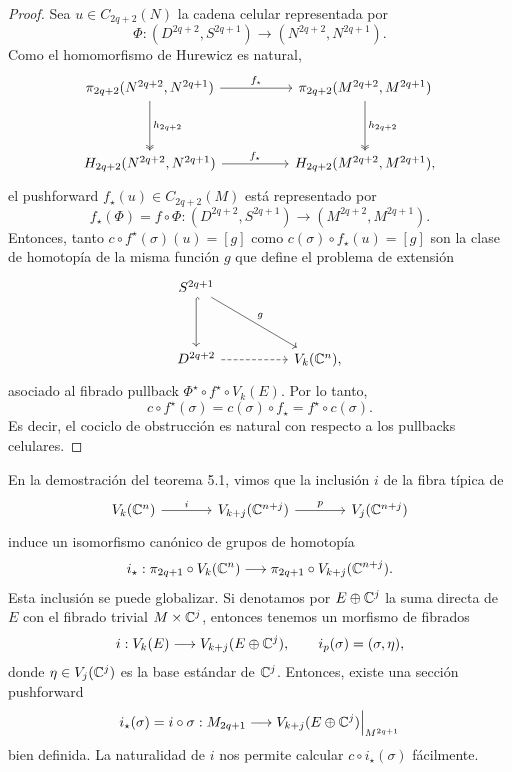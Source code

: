 \begin{proof}
Sea $u \in C_{2q+2}(N)$ la cadena celular representada por
$$\Phi : (D^{2q+2}, S^{2q+1}) \longrightarrow (N^{2q+2}, N^{2q+1}).$$
Como el homomorfismo de Hurewicz es natural,
$$
\begin{tikzcd}[row sep = huge, column sep = huge]
    \pi_{2q+2}(N^{2q+2}, N^{2q+1}) \arrow[r, "f_\star"] \arrow[d, two heads, "h_{2q+2}"]
        & \pi_{2q+2}(M^{2q+2}, M^{2q+1}) \arrow[d, two heads, "h_{2q+2}"] \\
    H_{2q+2}(N^{2q+2}, N^{2q+1}) \arrow[r, "f_\star"]
        & H_{2q+2}(M^{2q+2}, M^{2q+1}),
\end{tikzcd}
$$
el pushforward $f_\star(u) \in C_{2q+2}(M)$ está representado por
$$f_\star(\Phi) = f \circ \Phi : (D^{2q+2}, S^{2q+1}) \longrightarrow (M^{2q+2}, M^{2q+1}).$$
Entonces, tanto $c \circ f^\star(\sigma)(u) = [g]$ como $c(\sigma) \circ f_\star(u) = [g]$ son la clase de homotopía de la misma función $g$ que define el problema de extensión
$$
\begin{tikzcd}[row sep = huge, column sep = huge]
    S^{2q+1} \arrow[d, hook] \arrow[rd, "g"] \\
    D^{2q+2} \arrow[r, dashed] & V_k(\C^n),
\end{tikzcd}
$$
asociado al fibrado pullback $\Phi^\star \circ f^\star \circ V_k(E)$. Por lo tanto,
$$c \circ f^\star(\sigma) = c(\sigma) \circ f_\star = f^\star \circ c(\sigma).$$
Es decir, el cociclo de obstrucción es natural con respecto a los pullbacks celulares.
\end{proof}

En la demostración del teorema 5.1, vimos que la inclusión $i$ de la fibra típica de
$$
\begin{tikzcd}[row sep = large, column sep = large]
    V_k(\C^n) \arrow[r, "i"] & V_{k+j}(\C^{n+j}) \arrow[r, "p"] & V_j(\C^{n+j})
\end{tikzcd}
$$
induce un isomorfismo canónico de grupos de homotopía
$$i_\star : \pi_{2q+1} \circ V_k(\mathbb C^n) \longrightarrow \pi_{2q+1} \circ V_{k+j}(\mathbb C^{n+j}).$$
Esta inclusión se puede globalizar. Si denotamos por $E \oplus \mathbb C^j$ la suma directa de $E$ con el fibrado trivial $M \times \mathbb C^j$, entonces tenemos un morfismo de fibrados
$$i : V_k(E) \longrightarrow V_{k+j}(E \oplus \mathbb C^j), \qquad i_p(\sigma) = (\sigma, \eta),$$
donde $\eta \in V_j(\mathbb C^j)$ es la base estándar de $\mathbb C^j$. Entonces, existe una sección pushforward
$$i_\star(\sigma) = i \circ \sigma : M_{2q+1} \longrightarrow V_{k+j}(E \oplus \mathbb C^j) \Big \vert_{M^{2q+1}}$$
bien definida. La naturalidad de $i$ nos permite calcular $c \circ i_\star(\sigma)$ fácilmente.

